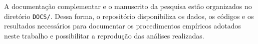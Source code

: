 A documentação complementar e o manuscrito da pesquisa estão organizados no diretório \texttt{DOCS/}. Dessa forma, o repositório disponibiliza os dados, os códigos e os resultados necessários para documentar os procedimentos empíricos adotados neste trabalho e possibilitar a reprodução das análises realizadas.

